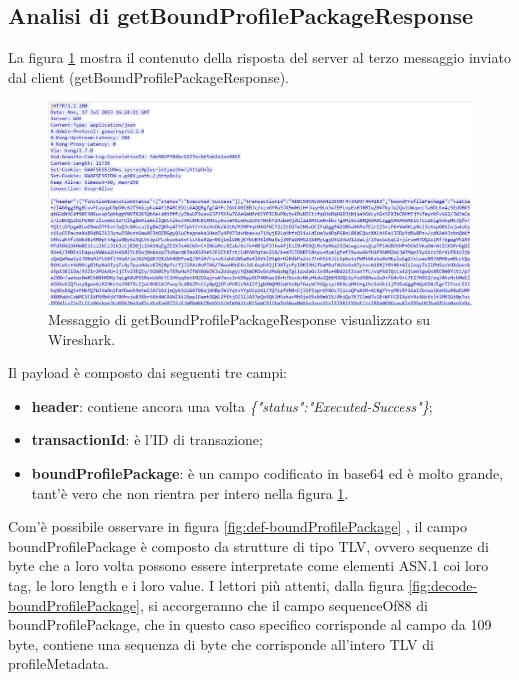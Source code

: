\documentclass[10pt, oneside]{book}
\begin{document}
\subsection{Analisi di getBoundProfilePackageResponse}
La figura \ref{fig:msg6-stream-pcap} mostra il contenuto della risposta del server al terzo messaggio inviato dal client (getBoundProfilePackageResponse).\\
\begin{figure}
\includegraphics[width=\linewidth]{msg6-stream-pcap.png}
\caption{Messaggio di getBoundProfilePackageResponse visualizzato su Wireshark.}
\label{fig:msg6-stream-pcap}
\end{figure}
Il payload è composto dai seguenti tre campi:
\begin{itemize}
\item \textbf{header}: contiene ancora una volta \textit{\{"status":"Executed-Success"\}};
\item \textbf{transactionId}: è l'ID di transazione;
\item \textbf{boundProfilePackage}: è un campo codificato in base64 ed è molto grande, tant'è vero che non rientra per intero nella figura \ref{fig:msg6-stream-pcap}.
\end{itemize}
Com'è possibile osservare in figura \ref{fig:def-boundProfilePackage} \cite{RSP-definitions}, il campo boundProfilePackage è composto da strutture di tipo TLV, ovvero sequenze di byte che a loro volta possono essere interpretate come elementi ASN.1 coi loro tag, le loro length e i loro value. I lettori più attenti, dalla figura \ref{fig:decode-boundProfilePackage}, si accorgeranno che il campo sequenceOf88 di boundProfilePackage, che in questo caso specifico corrisponde al campo da 109 byte, contiene una sequenza di byte che corrisponde all'intero TLV di profileMetadata.\\
\end{document}
